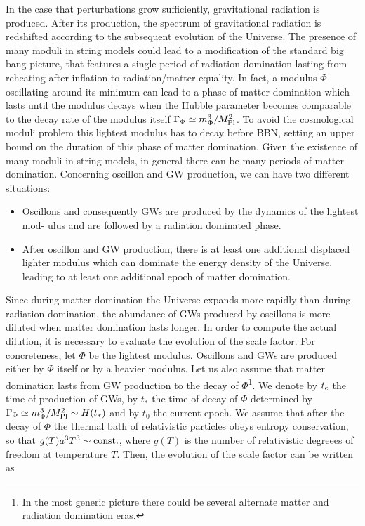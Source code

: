 \documentclass[12pt]{article}
\begin{document}
In the case that perturbations grow sufficiently, gravitational radiation is produced. After its production, the spectrum of gravitational radiation is redshifted according to the subsequent evolution of the Universe. The presence of many moduli in string models could lead to a modification of the standard big bang picture, that features a single period of radiation domination lasting from reheating after inflation to radiation/matter equality. In fact, a modulus $\Phi$ oscillating around its minimum can lead to a phase of matter domination which lasts until the modulus decays when the Hubble parameter becomes comparable to the decay rate of the modulus itself $\Gamma_\Phi\simeq m_{\Phi}^3/M_{\rm Pl}^2$. To avoid the cosmological moduli problem this lightest modulus has to decay before BBN, setting an upper bound on the duration of this phase of matter domination. Given the existence of many moduli in string models, in general there can be many periods of matter domination. Concerning oscillon and GW production, we can have two different situations:
\begin{itemize}
\item Oscillons and consequently GWs are produced by the dynamics of the lightest mod- ulus and are followed by a radiation dominated phase.
\item After oscillon and GW production, there is at least one additional displaced lighter modulus which can dominate the energy density of the Universe, leading to at least one additional epoch of matter domination.
\end{itemize}
Since during matter domination the Universe expands more rapidly than during radiation domination, the abundance of GWs produced by oscillons is more diluted when matter domination lasts longer. In order to compute the actual dilution, it is necessary to evaluate the evolution of the scale factor. For concreteness, let $\Phi$ be the lightest modulus. Oscillons and GWs are produced either by $\Phi$ itself or by a heavier modulus. Let us also assume that matter domination lasts from GW production to the decay of $\Phi$\footnote{In the most generic picture there could be several alternate matter and radiation domination eras.}. We denote by $t_{\rm e}$ the time of production of GWs, by $t_{*}$ the time of decay of $\Phi$ determined by $\Gamma_\Phi \simeq m_\Phi^3/M_{\rm Pl}^2 \sim H(t_{*})$ and by $t_0$ the current epoch. We assume that after the decay of $\Phi$ the thermal bath of relativistic particles obeys entropy conservation, so that $g(T) a^3 T^3 \sim \rm const.$, where $g(T)$ is the number of relativistic degreees of freedom at temperature $T$. Then, the evolution of the scale factor can be written as
\end{document}
